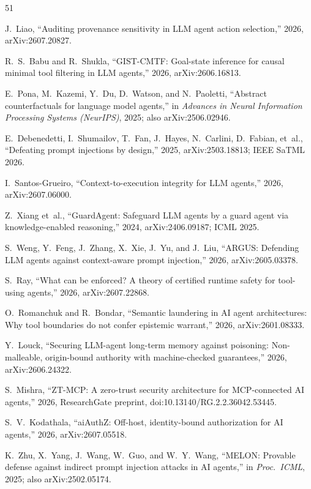 \documentclass[conference,compsoc]{IEEEtran}
\theoremstyle{definition}
\theoremstyle{plain}
\begin{document}
\begin{thebibliography}{51}
\footnotesize

 J.~Liao, ``Auditing provenance
sensitivity in LLM agent action selection,'' 2026,
arXiv:2607.20827.

 R.~S.~Babu and R.~Shukla, ``GIST-CMTF:
Goal-state inference for causal minimal tool filtering in LLM
agents,'' 2026, arXiv:2606.16813.

 E.~Pona, M.~Kazemi, Y.~Du, D.~Watson, and
N.~Paoletti, ``Abstract counterfactuals for language model
agents,'' in \emph{Advances in Neural Information Processing
Systems (NeurIPS)}, 2025; also arXiv:2506.02946.

 E.~Debenedetti, I.~Shumailov, T.~Fan, J.~Hayes,
N.~Carlini, D.~Fabian, et~al., ``Defeating prompt injections by
design,'' 2025, arXiv:2503.18813; IEEE SaTML 2026.

 I.~Santos-Grueiro, ``Context-to-execution integrity
for LLM agents,'' 2026, arXiv:2607.06000.

 Z.~Xiang et~al., ``GuardAgent: Safeguard LLM
agents by a guard agent via knowledge-enabled reasoning,'' 2024,
arXiv:2406.09187; ICML 2025.

 S.~Weng, Y.~Feng, J.~Zhang, X.~Xie, J.~Yu, and
J.~Liu, ``ARGUS: Defending LLM agents against
context-aware prompt injection,'' 2026, arXiv:2605.03378.

 S.~Ray, ``What can be enforced? A
theory of certified runtime safety for tool-using agents,'' 2026,
arXiv:2607.22868.

 O.~Romanchuk and R.~Bondar,
``Semantic laundering in AI agent architectures: Why tool
boundaries do not confer epistemic warrant,'' 2026,
arXiv:2601.08333.

 Y.~Louck, ``Securing LLM-agent long-term
memory against poisoning: Non-malleable, origin-bound authority
with machine-checked guarantees,'' 2026, arXiv:2606.24322.

 S.~Mishra, ``ZT-MCP: A zero-trust security
architecture for MCP-connected AI agents,'' 2026, ResearchGate
preprint, doi:10.13140/RG.2.2.36042.53445.

 S.~V.~Kodathala, ``aiAuthZ:
Off-host, identity-bound authorization for AI agents,'' 2026,
arXiv:2607.05518.

 K.~Zhu, X.~Yang, J.~Wang, W.~Guo, and W.~Y.~Wang,
``MELON: Provable defense against indirect prompt injection
attacks in AI agents,'' in \emph{Proc.\ ICML}, 2025; also
arXiv:2502.05174.


\end{thebibliography}
\end{document}
